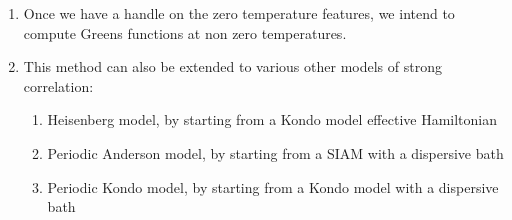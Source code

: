 \documentclass[10pt]{report}
\numberwithin{equation}{section}
\begin{document}
\begin{enumerate}
\item Once we have a handle on the zero temperature features, we intend to compute Greens functions at non zero temperatures.

\item This method can also be extended to various other models of strong correlation:
	\begin{enumerate}
		\item Heisenberg model, by starting from a Kondo model effective Hamiltonian
		\item Periodic Anderson model, by starting from a SIAM with a dispersive bath
		\item Periodic Kondo model, by starting from a Kondo model with a dispersive bath
	\end{enumerate}
\end{enumerate}
\end{document}
